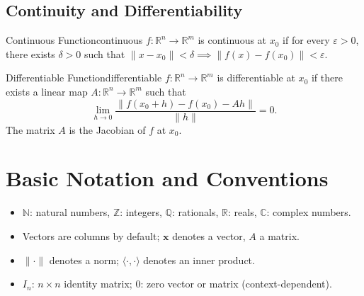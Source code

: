 \subsection{Continuity and Differentiability}

\begin{definition}{Continuous Function}{continuous}
    \(f : \mathbb{R}^n \to \mathbb{R}^m\) is continuous at \(x_0\) if for every \(\varepsilon > 0\), there exists \(\delta > 0\) such that \(\lVert x - x_0 \rVert < \delta \implies \lVert f(x) - f(x_0) \rVert < \varepsilon\).
\end{definition}

\begin{definition}{Differentiable Function}{differentiable}
    \(f : \mathbb{R}^n \to \mathbb{R}^m\) is differentiable at \(x_0\) if there exists a linear map \(A : \mathbb{R}^n \to \mathbb{R}^m\) such that
    \[
        \lim_{h \to 0} \frac{\lVert f(x_0 + h) - f(x_0) - A h \rVert}{\lVert h \rVert} = 0.
    \]
    The matrix \(A\) is the Jacobian of \(f\) at \(x_0\).
\end{definition}

\section{Basic Notation and Conventions}

\begin{itemize}[nosep]
    \item \(\mathbb{N}\): natural numbers, \(\mathbb{Z}\): integers, \(\mathbb{Q}\): rationals, \(\mathbb{R}\): reals, \(\mathbb{C}\): complex numbers.
    \item Vectors are columns by default; \(\mathbf{x}\) denotes a vector, \(A\) a matrix.
    \item \(\lVert \cdot \rVert\) denotes a norm; \(\langle \cdot, \cdot \rangle\) denotes an inner product.
    \item \(I_n\): \(n \times n\) identity matrix; \(0\): zero vector or matrix (context-dependent).
\end{itemize}